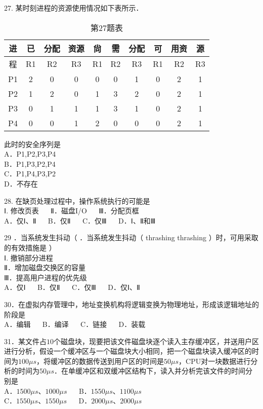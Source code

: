 27. 某时刻进程的资源使用情况如下表所示． \\
\begin{table}[ht]
\centering
\caption{第27题表}\label{Na11_tab2}
\begin{tabular}{|c|c|c|c|c|c|c|c|c|c|}
\hline
进 & 已 & 分配 & 资源 & 尙 & 需 & 分配 & 可 & 用资 & 源 \\
\hline
程 & R1 & R2 & R3 & R1 & R2 & R3 & R1 & R2 & R3 \\
\hline
P1 & 2 & 0 & 0 & 0 & 0 & 1 & 0 & 2 & 1 \\
\hline
P2 & 1 & 2 & 0 & 1 & 3 & 2 & 0 & 2 & 1 \\
\hline
P3 & 0 & 1 & 1 & 1 & 3 & 1 & 0 & 2 & 1 \\
\hline
P4 & 0 & 0 & 1 & 2 & 0 & 0 & 0 & 2 & 1 \\
\hline
\end{tabular}
\end{table}

此时的安全序列是 \\
A．P1,P2,P3,P4 \\
B．P1,P3,P2,P4 \\
C．P1,P4,P3,P2 \\
D．不存在


28. 在缺页处理过程中，操作系统执行的可能是 \\
Ⅰ. 修改页表 $\quad$ Ⅱ．磁盘I/O $\quad$ Ⅲ．分配页框 \\
A．仅Ⅰ、Ⅱ $\quad$ B．仅Ⅱ $\quad$ C．仅Ⅲ $\quad$ D．Ⅰ、Ⅱ和Ⅲ

29 ．当系统发生抖动（ ．当系统发生抖动（ thrashing thrashing ）时，可用采取的有效措施是 ） \\
Ⅰ. 撤销部分进程 \\
Ⅱ．增加磁盘交换区的容量 \\
Ⅲ．提高用户进程的优先级 \\
A．仅Ⅰ $\quad$ B．仅Ⅱ $\quad$ C．仅Ⅲ $\quad$ D．仅Ⅰ、Ⅱ

30．在虚拟内存管理中，地址变换机构将逻辑变换为物理地址，形成该逻辑地址的阶段是 \\
A．编辑 $\quad$ B．编译 $\quad$ C．链接 $\quad$ D．装载

31．某文件占$10$个磁盘块，现要把该文件磁盘块逐个读入主存缓冲区，并送用户区进行分析，假设一个缓冲区与一个磁盘块大小相同，把一个磁盘块读入缓冲区的时间为$100\mu s$，将缓冲区的数据传送到用户区的时间是$50\mu s$，CPU对一块数据进行分析的时间为$50\mu s$．在单缓冲区和双缓冲区结构下，读入并分析完该文件的时间分别是 \\
A．$1500\mu s$、$1000\mu s$ $\quad$ B．$1550\mu s$、$1100\mu s$ \\
C．$1550\mu s$、$1550\mu s$ $\quad$ D．$2000\mu s$、$2000\mu s$

